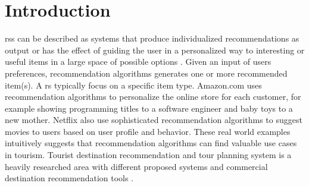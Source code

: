 

\chapter{Introduction}\label{chapter:introduction}
\Glspl{rs} can be described as systems that produce individualized recommendations
as output or has the effect of guiding the user in a personalized way to interesting
or useful items in a large space of possible options \parencite{Burke2002HybridInteraction}. Given an input of users preferences, recommendation algorithms generates one or more recommended item(s). A \gls{rs} typically focus on a specific item type. Amazon.com \parencite{} uses recommendation algorithms to personalize the online store for each customer, for example showing programming titles to a software engineer and baby toys to a new mother.  Netflix \parencite{Amatriain2013BigRecommendations} also use sophisticated recommendation algorithms to suggest movies to users based on user profile and behavior. These real world examples intuitively suggests that recommendation algorithms can find valuable use cases in tourism. Tourist destination recommendation and tour planning system is a heavily researched area with different proposed systems \parencite{wolfgang_umap_recsystem, cbrecsys2014, Thiengburanathum2018AnTourists, Arif2020Blockchain-BasedSystem, Alrasheed2020ASystem} and commercial destination recommendation tools \parencite{triparoti, Www.tripzard.com, Www.besttripchoices.com}.

